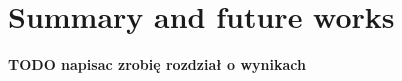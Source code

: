 \cleardoublepage
\section{Summary and future works} \label{chap:summ}
\textbf{TODO napisac zrobię rozdział o wynikach}